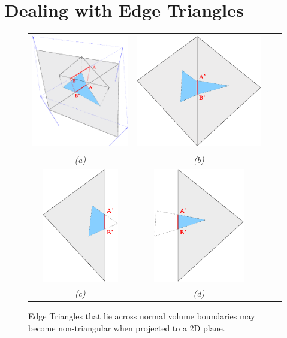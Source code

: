 \section{\label{sec:dispmapcreation:edges}Dealing with Edge Triangles}
\begin{figure}
\begin{center}
\begin{tabular}{cccc}
\includegraphics[height=5cm]{../images/edgetriangle_b} &
\includegraphics[height=5cm]{../images/edgetriangle_a} \\
{\it (a)} & {\it (b)} \\
\includegraphics[height=5cm]{../images/edgetriangle_c} &
\includegraphics[height=5cm]{../images/edgetriangle_d} \\
{\it (c)} & {\it (d)}
\end{tabular}
\caption[Edge Triangles]{\label{fig:edgetriangles} Edge Triangles that lie across normal volume boundaries may become non-triangular when projected to a 2D plane.}
\end{center}
\end{figure}
